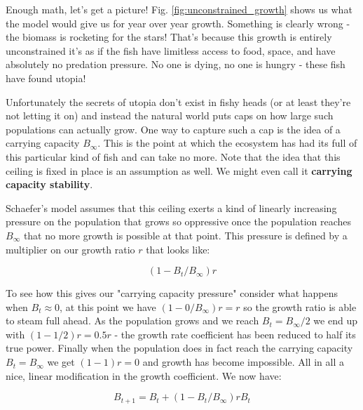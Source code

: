 \documentclass[11pt,a5paper]{book}
\begin{document}
Enough math, let's get a picture! Fig. \ref{fig:unconstrained_growth} shows us what the model would give us for year over year growth. Something is clearly wrong - the biomass is rocketing for the stars! That's because this growth is entirely unconstrained it's as if the fish have limitless access to food, space, and have absolutely no predation pressure. No one is dying, no one is hungry - these fish have found utopia!
\newline

Unfortunately the secrets of utopia don't exist in fishy heads (or at least they're not letting it on) and instead the natural world puts caps on how large such populations can actually grow. One way to capture such a cap is the idea of a carrying capacity $B_{\infty}$. This is the point at which the ecosystem has had its full of this particular kind of fish and can take no more. Note that the idea that this ceiling is fixed in place is an assumption as well. We might even call it \textbf{carrying capacity stability}. 
\newline

Schaefer's model assumes that this ceiling exerts a kind of linearly increasing pressure on the population that grows so oppressive once the population reaches $B_\infty$ that no more growth is possible at that point. This pressure is defined by a multiplier on our growth ratio $r$ that looks like:

$$(1-B_t/B_\infty)r$$

To see how this gives our "carrying capacity pressure" consider what happens when $B_t\approx 0$, at this point we have $(1-0/B_\infty)r=r$ so the growth ratio is able to steam full ahead. As the population grows and we reach $B_t=B_\infty / 2$ we end up with $(1-1/2)r =0.5r$ - the growth rate coefficient has been reduced to half its true power. Finally when the population does in fact reach the carrying capacity $B_t=B_\infty$ we get $(1-1)r=0$ and growth has become impossible. All in all a nice, linear modification in the growth coefficient. We now have:

$$B_{t+1} = B_{t} + (1 - B_t/B_\infty)rB_t$$
\end{document}
